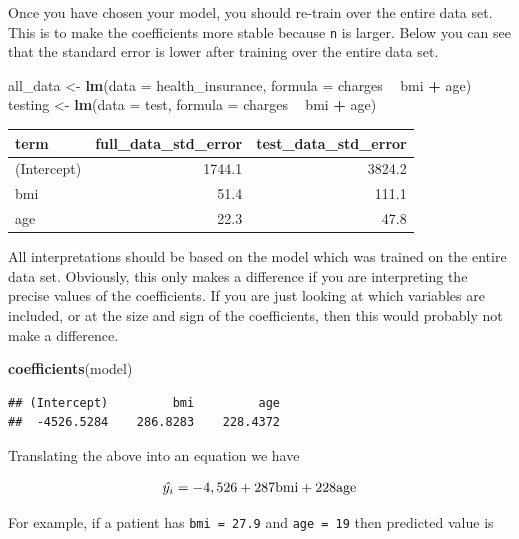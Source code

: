 \documentclass[openany]{book}
\newenvironment{Shaded}{\begin{snugshade}}{\end{snugshade}}
\newcommand{\DataTypeTok}[1]{\textcolor[rgb]{0.13,0.29,0.53}{#1}}
\newcommand{\KeywordTok}[1]{\textcolor[rgb]{0.13,0.29,0.53}{\textbf{#1}}}
\newcommand{\NormalTok}[1]{#1}
\newcommand{\OperatorTok}[1]{\textcolor[rgb]{0.81,0.36,0.00}{\textbf{#1}}}
\newcommand{\StringTok}[1]{\textcolor[rgb]{0.31,0.60,0.02}{#1}}
\begin{document}
Once you have chosen your model, you should re-train over the entire data set. This is to make the coefficients more stable because \texttt{n} is larger. Below you can see that the standard error is lower after training over the entire data set.

\begin{Shaded}
\begin{Highlighting}[]
\NormalTok{all_data <-}\StringTok{ }\KeywordTok{lm}\NormalTok{(}\DataTypeTok{data =}\NormalTok{ health_insurance, }
               \DataTypeTok{formula =}\NormalTok{ charges }\OperatorTok{~}\StringTok{ }\NormalTok{bmi }\OperatorTok{+}\StringTok{ }\NormalTok{age)}
\NormalTok{testing <-}\StringTok{ }\KeywordTok{lm}\NormalTok{(}\DataTypeTok{data =}\NormalTok{ test, }
              \DataTypeTok{formula =}\NormalTok{ charges }\OperatorTok{~}\StringTok{ }\NormalTok{bmi }\OperatorTok{+}\StringTok{ }\NormalTok{age)}
\end{Highlighting}
\end{Shaded}

\begin{longtable}[]{@{}lrr@{}}
\toprule
term & full\_data\_std\_error & test\_data\_std\_error\tabularnewline
\midrule
\endhead
(Intercept) & 1744.1 & 3824.2\tabularnewline
bmi & 51.4 & 111.1\tabularnewline
age & 22.3 & 47.8\tabularnewline
\bottomrule
\end{longtable}

All interpretations should be based on the model which was trained on the entire data set. Obviously, this only makes a difference if you are interpreting the precise values of the coefficients. If you are just looking at which variables are included, or at the size and sign of the coefficients, then this would probably not make a difference.

\begin{Shaded}
\begin{Highlighting}[]
\KeywordTok{coefficients}\NormalTok{(model)}
\end{Highlighting}
\end{Shaded}

\begin{verbatim}
## (Intercept)         bmi         age 
##  -4526.5284    286.8283    228.4372
\end{verbatim}

Translating the above into an equation we have

\[\hat{y_i} = -4,526 + 287 \space\text{bmi} + 228\space \text{age}\]

For example, if a patient has \texttt{bmi\ =\ 27.9} and \texttt{age\ =\ 19} then predicted value is
\end{document}
